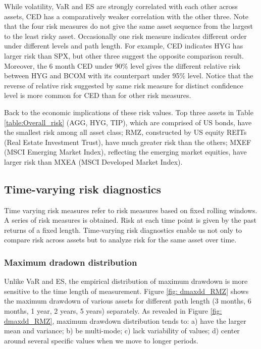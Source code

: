 \documentclass[11pt]{article}
\begin{document}
While volatility, VaR and ES are strongly correlated with each other across assets, CED has a comparatively weaker correlation with the other three. Note that the four risk measures do not give the same asset sequence from the largest to the least risky asset. Occasionally one risk measure indicates different order under different levels and path length. For example, CED indicates HYG has larger risk than SPX, but other three suggest the opposite comparison result. Moreover, the 6 month CED under 90\% level gives the different relative risk between HYG and BCOM with its counterpart under 95\% level. Notice that the reverse of relative risk suggested by same risk measure for distinct confidence level is more common for CED than for other risk measures.

Back to the economic implications of these risk values. Top three assets in Table \ref{table:Overall_risk} (AGG, HYG, TIP), which are comprised of US bonds, have the smallest risk among all asset class; RMZ, constructed by US equity REITs (Real Estate Investment Trust), have much greater risk than the others; MXEF (MSCI Emerging Market Index), reflecting the emerging market equities, have larger risk than MXEA (MSCI Developed Market Index).

\subsection{Time-varying risk diagnostics}

Time varying risk measures refer to risk measures based on fixed rolling windows. A series of risk measures is obtained. Risk at each time point is given by the past returns of a fixed length. Time-varying risk diagnostics enable us not only to compare risk across assets but to analyze risk for the same asset over time. 

\subsubsection{Maximum dradown distribution}

Unlike VaR and ES, the empirical distribution of maximum drawdown is more sensitive to the time length of measurement. Figure \ref{fig: dmaxdd_RMZ} shows the maximum drawdown of various assets for different path length (3 months, 6 months, 1 year, 2 years, 5 years) separately. As revealed in Figure \ref{fig: dmaxdd_RMZ}, maximum drawdown distribution tends to: a) have the larger mean and variance; b) be multi-mode; c) lack variability of values; d) center around several specific values when we move to longer periods. 
\end{document}
